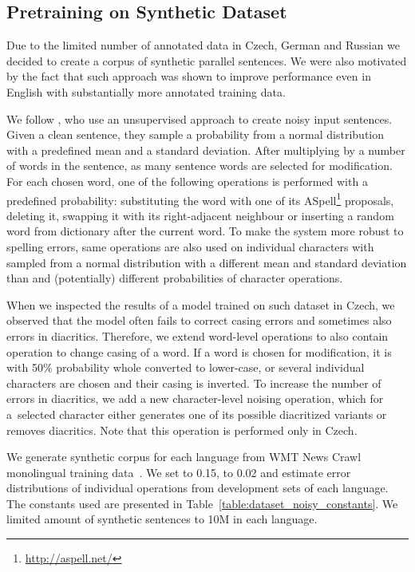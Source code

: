 \documentclass[11pt,a4paper]{article}
\begin{document}
\subsection{Pretraining on Synthetic Dataset}

Due to the limited number of annotated data in Czech, German and Russian we decided to create a corpus of synthetic parallel sentences. We were also motivated by the fact that such approach was shown to improve performance even in English with substantially more annotated training data. 

We follow , who use an unsupervised approach to create noisy input sentences. Given a clean sentence, they sample a probability  from a normal distribution with a predefined mean and a standard deviation. After multiplying  by a number of words in the sentence, as many sentence words are selected for modification. For each chosen word, one of the following operations is performed with a predefined probability: substituting the word with one of its ASpell\footnote{\scriptsize\url{http://aspell.net/}} proposals, deleting it, swapping it with its right-adjacent neighbour or inserting a random word from dictionary after the current word. To make the system more robust to spelling errors, same operations are also used on individual characters with  sampled from a normal distribution with a different mean and standard deviation than  and (potentially) different probabilities of character operations.

When we inspected the results of a model trained on such dataset in Czech, we observed that the model often fails to correct casing errors and sometimes also errors in diacritics. Therefore, we extend word-level operations to also contain operation to change casing of a word. If a word is chosen for modification, it is with 50\% probability whole converted to lower-case, or several individual characters are chosen and their casing is inverted. To increase the number of errors in diacritics, we add a new character-level noising operation, which for a~selected character either generates one of its possible diacritized variants or removes diacritics. Note that this operation is performed only in Czech.

We generate synthetic corpus for each language from WMT News Crawl monolingual training data~\cite{ondrej2017findings}. We set  to 0.15,  to 0.02 and estimate error distributions of individual operations from development sets of each language. The constants used are presented in Table~\ref{table:dataset_noisy_constants}. We limited amount of synthetic sentences to 10M in each language.
\end{document}

